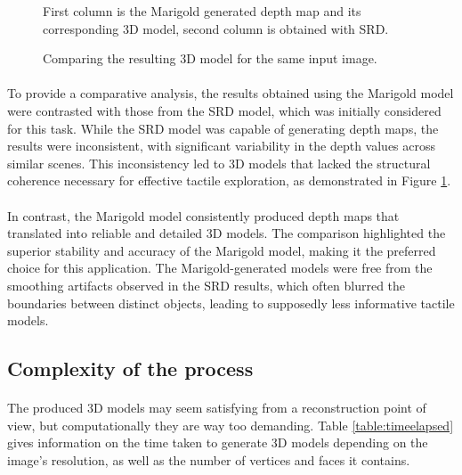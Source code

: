 \documentclass[12pt, letterpaper]{article}
\begin{document}
\begin{spacing}{1.15}
\begin{figure}[!ht]
\begin{center}
        \caption{Comparing the resulting 3D model for the same input image.}
        \label{comparison}
    \end{center}
    \small
    First column is the Marigold generated depth map and its corresponding 3D model, second column is obtained with SRD.
\end{figure}

\paragraph{}
To provide a comparative analysis, the results obtained using the Marigold model were contrasted with those from the SRD model, which was
initially considered for this task. While the SRD model was capable of generating depth maps, the results were
inconsistent, with significant variability in the depth values across similar scenes. This inconsistency led to 3D models that lacked
the structural coherence necessary for effective tactile exploration, as demonstrated in Figure \ref{comparison}.

\paragraph{}
In contrast, the Marigold model consistently produced depth maps that translated into reliable and detailed 3D models.
The comparison highlighted the superior stability and accuracy of the Marigold model, making it the preferred choice for this application.
The Marigold-generated models were free from the smoothing artifacts observed in the SRD results, which often blurred the boundaries between
distinct objects, leading to supposedly less informative tactile models.

\subsection{Complexity of the process}

\paragraph{} The produced 3D models may seem satisfying from a reconstruction point of view, but computationally they are way too demanding. Table \ref{table:timeelapsed} gives
information on the time taken to generate 3D models depending on the image's resolution, as well as the number of vertices and faces it contains.\\


\end{spacing}
\end{document}

